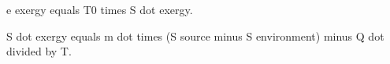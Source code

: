 e exergy equals T0 times S dot exergy.

S dot exergy equals m dot times (S source minus S environment) minus Q dot divided by T.